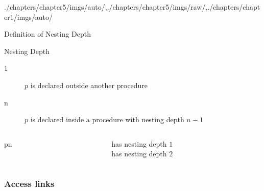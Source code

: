 \begin{graphicspathcontext}{{./chapters/chapter5/imgs/auto/},{./chapters/chapter5/imgs/raw/},{./chapters/chapter1/imgs/auto/}}
\begin{bibunit}[apalike]
\begin{frame}{{Definition} of Nesting Depth}
	\begin{definitionblock}{Nesting Depth}
		\begin{description}
			\item[1] $p$ is declared outside another procedure
			\item[n] $p$ is declared inside a procedure with nesting depth $n-1$
		\end{description}
	\end{definitionblock}
	\begin{columns}
		\begin{column}[t]{.3\linewidth}
			\vspace{-.5cm}
			\begin{scriptsize}
				\begin{myprocedure}{p}{n}
				\end{myprocedure}
			\end{scriptsize}
		\end{column}
		\begin{column}[t]{.35\linewidth}
			\begin{small}
				 has nesting depth $1$ \\
				\vspace{2em}
				 has nesting depth $2$
			\end{small}
		\end{column}
	\end{columns}
\end{frame}

\subsubsection{Access links}
\subsubsectiontableofcontentslide


\end{bibunit}
\end{graphicspathcontext}
